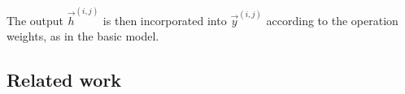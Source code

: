 The output $\vec{h}^{(i,j)}$ is then incorporated into $\vec{y}^{(i,j)}$ according to the operation weights, as in the basic model.




\subsection{Related work}

